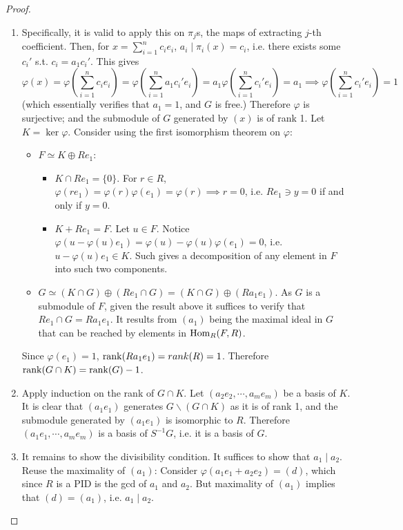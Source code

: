 \documentclass{article}
\begin{document}
\begin{proof}
\begin{itemize}
\begin{enumerate}[label=\arabic*)]
            \item Specifically, it is valid to apply this on $\pi_j$s, the maps of extracting $j$-th coefficient. Then, for $x = \sum_{i=1}^n c_i e_i$, $a_i \mid \pi_i(x) = c_i$, i.e. there exists some $c_i'$ s.t. $c_i = a_1 c_i'$. This gives
            \[
                \varphi(x) = \varphi\left(\sum_{i=1}^n c_i e_i\right) = \varphi\left(\sum_{i=1}^n a_1 c_i' e_i\right) = a_1 \varphi\left( \sum_{i=1}^n c_i' e_i \right) = a_1 \implies \varphi \left( \sum_{i=1}^n c_i' e_i \right) = 1
            \]
            (which essentially verifies that $a_1 = 1$, and $G$ is free.) Therefore $\varphi$ is surjective; and the submodule of $G$ generated by $(x)$ is of rank 1. Let $K = \ker \varphi$. Consider using the first isomorphism theorem on $\varphi$:
            \begin{itemize}
                \item $F \simeq K \oplus Re_1$:
                \begin{itemize}
                    \item $K \cap Re_1 = \{0\}$. For $r\in R$, $\varphi(r e_1) = \varphi(r) \varphi(e_1) = \varphi(r) \implies r = 0$, i.e. $Re_1 \ni y = 0$ if and only if $y = 0$.
                    \item $K + Re_1 = F$. Let $u\in F$. Notice $\varphi(u - \varphi(u)e_1) = \varphi(u) - \varphi(u) \varphi(e_1) = 0$, i.e. $u - \varphi(u)e_1 \in K$. Such gives a decomposition of any element in $F$ into such two components.
                \end{itemize}
                \item $G \simeq (K \cap G) \oplus (Re_1 \cap G) = (K \cap G) \oplus (R a_1 e_1)$. As $G$ is a submodule of $F$, given the result above it suffices to verify that $Re_1 \cap G = Ra_1 e_1$. It results from $(a_1)$ being the maximal ideal in $G$ that can be reached by elements in $\mathrm{Hom}_R(F, R)$.
            \end{itemize}
            Since $\varphi(e_1) = 1$, $\mathrm{rank}(Ra_1 e_1) = rank(R) = 1$. Therefore $\mathrm{rank}(G \cap K) = \mathrm{rank}(G) - 1$.
            \item Apply induction on the rank of $G \cap K$. Let $(a_2 e_2, \cdots, a_m e_m)$ be a basis of $K$. It is clear that $(a_1 e_1)$ generates $G \smallsetminus (G \cap K)$ as it is of rank 1, and the submodule generated by $(a_1 e_1)$ is isomorphic to $R$. Therefore $(a_1e_1, \cdots, a_m e_m)$ is a basis of $S^{-1}G$, i.e. it is a basis of $G$. 
            \item It remains to show the divisibility condition. It suffices to show that $a_1 \mid a_2$. Reuse the maximality of $(a_1)$: Consider $\varphi(a_1 e_1 + a_2 e_2) = (d)$, which since $R$ is a PID is the gcd of $a_1$ and $a_2$. But maximality of $(a_1)$ implies that $(d) = (a_1)$, i.e. $a_1 \mid a_2$.  
        \end{enumerate}
    \end{itemize}
\end{proof}
\end{document}
